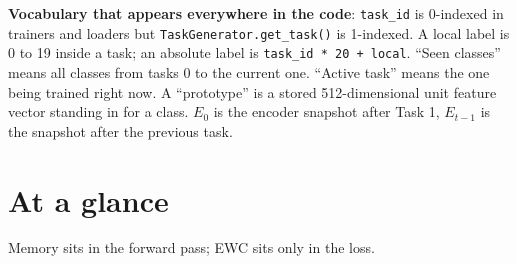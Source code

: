 \documentclass[11pt,a4paper]{article}
\newcommand{\code}[1]{\texttt{#1}}
\begin{document}
\textbf{Vocabulary that appears everywhere in the code}: \code{task\_id} is 0-indexed in trainers and loaders but \code{TaskGenerator.get\_task()} is 1-indexed. A local label is 0 to 19 inside a task; an absolute label is \code{task\_id * 20 + local}. ``Seen classes'' means all classes from tasks 0 to the current one. ``Active task'' means the one being trained right now. A ``prototype'' is a stored 512-dimensional unit feature vector standing in for a class. $E_0$ is the encoder snapshot after Task 1, $E_{t-1}$ is the snapshot after the previous task.

\section{At a glance}

Memory sits in the forward pass; EWC sits only in the loss.
\end{document}
